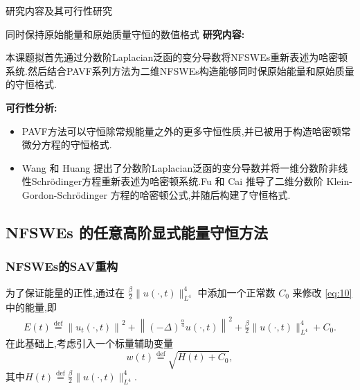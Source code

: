 \documentclass[aspectratio=169]{beamer}
\begin{document}
\begin{frame}{研究内容及其可行性研究}
	\begin{block}{同时保持原始能量和原始质量守恒的数值格式}
		\textbf{\textcolor[rgb]{0.227,0.373,0.306}{研究内容:}}
		
		{\footnotesize 本课题拟首先通过分数阶Laplacian泛函的变分导数将NFSWEs重新表述为哈密顿系统.然后结合PAVF系列方法为二维NFSWEs构造能够同时保原始能量和原始质量的守恒格式.}
		
		\textbf{\textcolor[rgb]{0.227,0.373,0.306}{可行性分析:}}
		\begin{itemize}
			\item {\footnotesize PAVF方法可以守恒除常规能量之外的更多守恒性质,并已被用于构造哈密顿常微分方程的守恒格式\cite{caiPartitionedAveragedVector2018}.​​​​​​​​​​​​​​​​​​​​​​​​​​​​​​​​​​​​​​​​​​​​​​​​​​​​​​​​​​​​​​​​​​​​​​​​​​​​​​​​​​​​​​​​​​​​​​​​​​​​​​​​​​​​​​​​​​​​​​​​​​​​​​​​​​​​​​​​​​​​​​​​​​​​​​​​​​​​​​​​​​​​​​​​​​​​​​​​​​​​​​​​​​​​​​​​​​​​​​​​​​​​​​​​​​​​​​​​​​​​​​​​​​​​​​​​​​​​​​​​​​​​​​​​​​​​​​​​​​​​​​​​​​​​​​​​​​​​​​​​​​​​​​​​​​​​​​​​​​​​​​​​​​​​​​​​​​​​​​​​​​}
			\item {\footnotesize Wang 和 Huang \cite{wangStructurepreservingNumericalMethods2018} 提出了分数阶Laplacian泛函的变分导数并将一维分数阶非线性Schrödinger方程重新表述为哈密顿系统.Fu 和 Cai \cite{fuStructurepreservingAlgorithmsTwodimensional2020} 推导了二维分数阶 Klein-Gordon-Schrödinger 方程的哈密顿公式,并随后构建了守恒格式.}
			\end{itemize}
	\end{block}
	\end{frame}
	
\subsection{NFSWEs 的任意高阶显式能量守恒方法}
\begin{frame}\frametitle{NFSWEs的SAV重构}
	为了保证能量的正性,通过在 $\frac{\beta}{2}\|u(\cdot, t)\|_{L^{4}}^{4}$ 中添加一个正常数 $C_0$ 来修改 \eqref{eq:10} 中的能量,即
	\begin{align}\label{eq_SAVRRK:9_1}
		E(t)\overset{\text{def}}{=}\left\|u_{t}(\cdot, t)\right\|^{2}+\left\|(-\Delta)^{\frac{\alpha}{4}} u(\cdot, t)\right\|^{2}+\frac{\beta}{2}\|u(\cdot, t)\|_{L^{4}}^{4} + C_0.
	\end{align}
	在此基础上,考虑引入一个标量辅助变量
	\begin{equation}
		w(t)\overset{\text{def}}{=}\sqrt{H(t)+C_0},
	\end{equation}
	其中$H(t)\overset{\text{def}}{=}\frac{\beta}{2}\|u(\cdot, t)\|_{L^{4}}^{4} .$
\end{frame}
\end{document}
